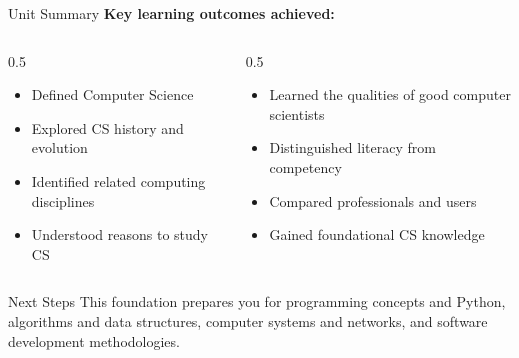 \documentclass[aspectratio=169]{beamer}
\begin{document}
\begin{frame}{Unit Summary}
  \textbf{Key learning outcomes achieved:}
  \vspace{0.3cm}
  \begin{columns}[T]
    \begin{column}{0.5\textwidth}
      \begin{itemize}
        \item[\checkmark] Defined Computer Science
        \item[\checkmark] Explored CS history and evolution
        \item[\checkmark] Identified related computing disciplines
        \item[\checkmark] Understood reasons to study CS
      \end{itemize}
    \end{column}
    \begin{column}{0.5\textwidth}
      \begin{itemize}
        \item[\checkmark] Learned the qualities of good computer scientists
        \item[\checkmark] Distinguished literacy from competency
        \item[\checkmark] Compared professionals and users
        \item[\checkmark] Gained foundational CS knowledge
      \end{itemize}
    \end{column}
  \end{columns}
  \vspace{0.4cm}
  \begin{alertblock}{Next Steps}
    This foundation prepares you for programming concepts and Python,
    algorithms and data structures, computer systems and networks, and
    software development methodologies.
  \end{alertblock}
\end{frame}
\end{document}
